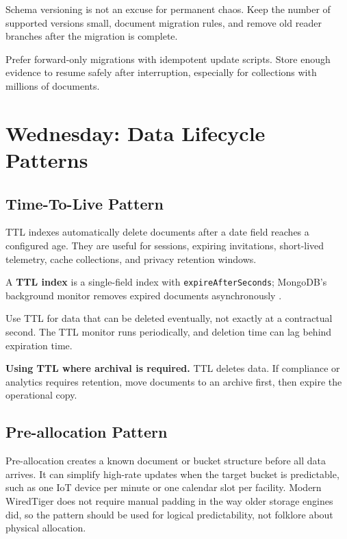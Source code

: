 \begin{notebox}
Schema versioning is not an excuse for permanent chaos. Keep the number of supported versions small, document migration rules, and remove old reader branches after the migration is complete.
\end{notebox}

\begin{tipbox}
Prefer forward-only migrations with idempotent update scripts. Store enough evidence to resume safely after interruption, especially for collections with millions of documents.
\end{tipbox}

\section{Wednesday: Data Lifecycle Patterns}
\subsection{Time-To-Live Pattern}
TTL indexes automatically delete documents after a date field reaches a configured age. They are useful for sessions, expiring invitations, short-lived telemetry, cache collections, and privacy retention windows.

\begin{definitionbox}
A \textbf{TTL index} is a single-field index with \texttt{expireAfterSeconds}; MongoDB's background monitor removes expired documents asynchronously \cite{mongodbTTLDocs}.
\end{definitionbox}

\begin{tipbox}
Use TTL for data that can be deleted eventually, not exactly at a contractual second. The TTL monitor runs periodically, and deletion time can lag behind expiration time.
\end{tipbox}

\begin{pitfall}
\textbf{Using TTL where archival is required.} TTL deletes data. If compliance or analytics requires retention, move documents to an archive first, then expire the operational copy.
\end{pitfall}

\subsection{Pre-allocation Pattern}
Pre-allocation creates a known document or bucket structure before all data arrives. It can simplify high-rate updates when the target bucket is predictable, such as one IoT device per minute or one calendar slot per facility. Modern WiredTiger does not require manual padding in the way older storage engines did, so the pattern should be used for logical predictability, not folklore about physical allocation.

